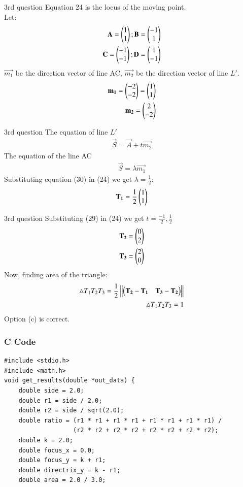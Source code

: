 \documentclass{beamer}
\begin{document}
\begin{frame}{3rd question}
    Equation 24 is the locus of the moving point.\\
Let:
\begin{align}
    \mathbf{A}=\begin{pmatrix}1\\1\end{pmatrix};\mathbf{B}=\begin{pmatrix}-1\\1\end{pmatrix}\\
    \mathbf{C}=\begin{pmatrix}-1\\-1\end{pmatrix};\mathbf{D}=\begin{pmatrix}1\\-1\end{pmatrix}
\end{align}
$\vec{m_1}$ be the direction vector of line AC, $\vec{m_2}$ be the direction vector of line $L'$.
\begin{align}
    \mathbf{m_1} = \begin{pmatrix}-2\\-2\end{pmatrix}=\begin{pmatrix}1\\1\end{pmatrix}\\
    \mathbf{m_2} = \begin{pmatrix}2\\-2\end{pmatrix}
\end{align}
\end{frame}

\begin{frame}{3rd question}
    The equation of line $L'$ 
\begin{align} \vec{S}=\vec{A}+t\vec{m_2}\end{align}
The equation of the line AC
\begin{align}
\vec{S}=\lambda \vec{m_1}
\end{align}
Substituting equation (30) in (24) we get $\lambda=\frac{1}{2}$:
\begin{align}
    \mathbf{T_1}=\frac{1}{2}\begin{pmatrix}1\\1\end{pmatrix}
\end{align}
\end{frame}

\begin{frame}{3rd question}
    Substituting (29) in (24) we get $t=\frac{-1}{2},\frac{1}{2}$
\begin{align}
    \mathbf{T_2}=\begin{pmatrix}0\\2\end{pmatrix}\\
    \mathbf{T_3}=\begin{pmatrix}2\\0\end{pmatrix}
\end{align}
Now, finding area of the triangle:
\begin{align}
    \triangle T_1T_2T_3=\frac{1}{2}\left\lVert\begin{pmatrix}\mathbf{T_2}-\mathbf{T_1}&\mathbf{T_3}-\mathbf{T_2}\end{pmatrix}\right\rVert\\
    \triangle T_1T_2T_3 = 1
\end{align}
Option (c) is correct.
\end{frame}
\begin{frame}[fragile]
    \frametitle{C Code}
    \begin{lstlisting}
#include <stdio.h>
#include <math.h>
void get_results(double *out_data) {
    double side = 2.0;
    double r1 = side / 2.0;          
    double r2 = side / sqrt(2.0);   
    double ratio = (r1 * r1 + r1 * r1 + r1 * r1 + r1 * r1) /
                   (r2 * r2 + r2 * r2 + r2 * r2 + r2 * r2);
    double k = 2.0;
    double focus_x = 0.0;
    double focus_y = k + r1;
    double directrix_y = k - r1;
    double area = 2.0 / 3.0;
    \end{lstlisting}
\end{frame}
\end{document}
